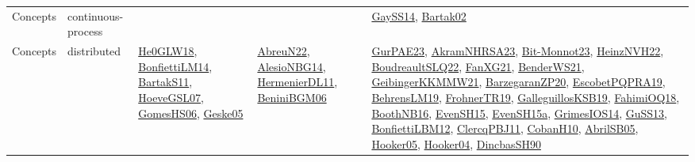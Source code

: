 {\begin{longtable}{lp{3cm}>{\raggedright}p{6cm}>{\raggedright}p{6cm}p{8cm}}
Concepts & continuous-process &  &  & \href{papers/GaySS14.pdf}{GaySS14}\cite{GaySS14}, \href{papers/Bartak02.pdf}{Bartak02}\cite{Bartak02}\\
Concepts & distributed & \href{papers/He0GLW18.pdf}{He0GLW18}\cite{He0GLW18}, \href{papers/BonfiettiLM14.pdf}{BonfiettiLM14}\cite{BonfiettiLM14}, \href{articles/BartakS11.pdf}{BartakS11}\cite{BartakS11}, \href{papers/HoeveGSL07.pdf}{HoeveGSL07}\cite{HoeveGSL07}, \href{papers/GomesHS06.pdf}{GomesHS06}\cite{GomesHS06}, \href{papers/Geske05.pdf}{Geske05}\cite{Geske05} & \href{articles/AbreuN22.pdf}{AbreuN22}\cite{AbreuN22}, \href{papers/AlesioNBG14.pdf}{AlesioNBG14}\cite{AlesioNBG14}, \href{papers/HermenierDL11.pdf}{HermenierDL11}\cite{HermenierDL11}, \href{papers/BeniniBGM06.pdf}{BeniniBGM06}\cite{BeniniBGM06} & \href{articles/GurPAE23.pdf}{GurPAE23}\cite{GurPAE23}, \href{articles/AkramNHRSA23.pdf}{AkramNHRSA23}\cite{AkramNHRSA23}, \href{papers/Bit-Monnot23.pdf}{Bit-Monnot23}\cite{Bit-Monnot23}, \href{articles/HeinzNVH22.pdf}{HeinzNVH22}\cite{HeinzNVH22}, \href{papers/BoudreaultSLQ22.pdf}{BoudreaultSLQ22}\cite{BoudreaultSLQ22}, \href{articles/FanXG21.pdf}{FanXG21}\cite{FanXG21}, \href{papers/BenderWS21.pdf}{BenderWS21}\cite{BenderWS21}, \href{papers/GeibingerKKMMW21.pdf}{GeibingerKKMMW21}\cite{GeibingerKKMMW21}, \href{papers/BarzegaranZP20.pdf}{BarzegaranZP20}\cite{BarzegaranZP20}, \href{articles/EscobetPQPRA19.pdf}{EscobetPQPRA19}\cite{EscobetPQPRA19}, \href{papers/BehrensLM19.pdf}{BehrensLM19}\cite{BehrensLM19}, \href{papers/FrohnerTR19.pdf}{FrohnerTR19}\cite{FrohnerTR19}, \href{papers/GalleguillosKSB19.pdf}{GalleguillosKSB19}\cite{GalleguillosKSB19}, \href{articles/FahimiOQ18.pdf}{FahimiOQ18}\cite{FahimiOQ18}, \href{papers/BoothNB16.pdf}{BoothNB16}\cite{BoothNB16}, \href{papers/EvenSH15.pdf}{EvenSH15}\cite{EvenSH15}, \href{articles/EvenSH15a.pdf}{EvenSH15a}\cite{EvenSH15a}, \href{articles/GrimesIOS14.pdf}{GrimesIOS14}\cite{GrimesIOS14}, \href{papers/GuSS13.pdf}{GuSS13}\cite{GuSS13}, \href{papers/BonfiettiLBM12.pdf}{BonfiettiLBM12}\cite{BonfiettiLBM12}, \href{papers/ClercqPBJ11.pdf}{ClercqPBJ11}\cite{ClercqPBJ11}, \href{papers/CobanH10.pdf}{CobanH10}\cite{CobanH10}, \href{papers/AbrilSB05.pdf}{AbrilSB05}\cite{AbrilSB05}, \href{articles/Hooker05.pdf}{Hooker05}\cite{Hooker05}, \href{papers/Hooker04.pdf}{Hooker04}\cite{Hooker04}, \href{articles/DincbasSH90.pdf}{DincbasSH90}\cite{DincbasSH90}\\

\end{longtable}}
